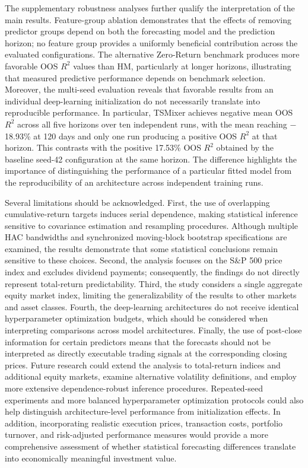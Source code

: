 \documentclass[runningheads,orivec]{llncs}
\begin{document}
The supplementary robustness analyses further qualify the interpretation of the main results. Feature-group ablation demonstrates that the effects of removing predictor groups depend on both the forecasting model and the prediction horizon; no feature group provides a uniformly beneficial contribution across the evaluated configurations. The alternative Zero-Return benchmark produces more favorable OOS $R^2$ values than HM, particularly at longer horizons, illustrating that measured predictive performance depends on benchmark selection. Moreover, the multi-seed evaluation reveals that favorable results from an individual deep-learning initialization do not necessarily translate into reproducible performance. In particular, TSMixer achieves negative mean OOS $R^2$ across all five horizons over ten independent runs, with the mean reaching $-$18.93\% at 120 days and only one run producing a positive OOS $R^2$ at that horizon. This contrasts with the positive 17.53\% OOS $R^2$ obtained by the baseline seed-42 configuration at the same horizon. The difference highlights the importance of distinguishing the performance of a particular fitted model from the reproducibility of an architecture across independent training runs.

Several limitations should be acknowledged. First, the use of overlapping cumulative-return targets induces serial dependence, making statistical inference sensitive to covariance estimation and resampling procedures. Although multiple HAC bandwidths and synchronized moving-block bootstrap specifications are examined, the results demonstrate that some statistical conclusions remain sensitive to these choices. Second, the analysis focuses on the S\&P 500 price index and excludes dividend payments; consequently, the findings do not directly represent total-return predictability. Third, the study considers a single aggregate equity market index, limiting the generalizability of the results to other markets and asset classes. Fourth, the deep-learning architectures do not receive identical hyperparameter optimization budgets, which should be considered when interpreting comparisons across model architectures. Finally, the use of post-close information for certain predictors means that the forecasts should not be interpreted as directly executable trading signals at the corresponding closing prices. Future research could extend the analysis to total-return indices and additional equity markets, examine alternative volatility definitions, and employ more extensive dependence-robust inference procedures. Repeated-seed experiments and more balanced hyperparameter optimization protocols could also help distinguish architecture-level performance from initialization effects. In addition, incorporating realistic execution prices, transaction costs, portfolio turnover, and risk-adjusted performance measures would provide a more comprehensive assessment of whether statistical forecasting differences translate into economically meaningful investment value.
\end{document}
